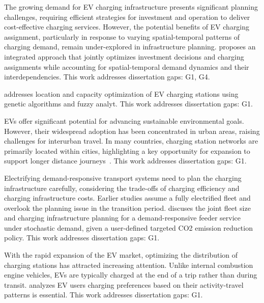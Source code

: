 \documentclass[letterpaper, 12pt, oneside, doublespacing]{Thesis}
\begin{document}
\noindent The growing demand for EV charging infrastructure presents significant planning challenges, requiring efficient strategies for investment and operation to deliver cost-effective charging services. However, the potential benefits of EV charging assignment, particularly in response to varying spatial-temporal patterns of charging demand, remain under-explored in infrastructure planning. \cite{large_language_2025} proposes an integrated approach that jointly optimizes investment decisions and charging assignments while accounting for spatial-temporal demand dynamics and their interdependencies. This work addresses dissertation gaps: G1, G4.



\noindent \cite{location_and_2025} addresses location and capacity optimization of EV charging stations using genetic algorithms and fuzzy analyt. This work addresses dissertation gaps: G1.



\noindent EVs offer significant potential for advancing sustainable environmental goals. However, their widespread adoption has been concentrated in urban areas, raising challenges for interurban travel. In many countries, charging station networks are primarily located within cities, highlighting a key opportunity for expansion to support longer distance journeys~\cite{multiobjective_model_2025}. This work addresses dissertation gaps: G1.



\noindent Electrifying demand-responsive transport systems need to plan the charging infrastructure carefully, considering the trade-offs of charging efficiency and charging infrastructure costs. Earlier studies assume a fully electrified fleet and overlook the planning issue in the transition period. \cite{optimal_mixed_2025} discuses the joint fleet size and charging infrastructure planning for a demand-responsive feeder service under stochastic demand, given a user-defined targeted CO2 emission reduction policy. This work addresses dissertation gaps: G1.



\noindent With the rapid expansion of the EV market, optimizing the distribution of charging stations has attracted increasing attention. Unlike internal combustion engine vehicles, EVs are typically charged at the end of a trip rather than during transit. \cite{optimization_of_2025} analyzes EV users charging preferences based on their activity-travel patterns is essential. This work addresses dissertation gaps: G1.
\end{document}
